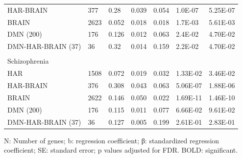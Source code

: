 \begin{refsection}
\begin{table}[H]
\begin{tabular}{@{}lllllll@{}}
HAR-BRAIN                         & 377  & 0.28   & 0.039  & 0.054 & 1.0E-07  & 5.25E-07   \\
BRAIN                             & 2623 & 0.052  & 0.018  & 0.018 & 1.7E-03  & 5.61E-03   \\
DMN (200)                         & 176  & 0.126  & 0.012  & 0.063 & 2.4E-02  & 4.70E-02   \\
DMN-HAR-BRAIN (37)                & 36   & 0.32   & 0.014  & 0.159 & 2.2E-02  & 4.70E-02   \\
                                  &      &        &        &       &          &            \\
Schizophrenia                     &      &        &        &       &          &            \\
HAR                               & 1508 & 0.072  & 0.019  & 0.032 & 1.33E-02 & 3.46E-02   \\
HAR-BRAIN                         & 376  & 0.308  & 0.043  & 0.063 & 5.06E-07 & 1.88E-06   \\
BRAIN                             & 2622 & 0.146  & 0.050  & 0.022 & 1.69E-11 & 1.46E-10   \\
DMN (200)                         & 176  & 0.115  & 0.011  & 0.077 & 6.66E-02 & 9.61E-02   \\
DMN-HAR-BRAIN (37)                & 36   & 0.127  & 0.005  & 0.199 & 2.61E-01 & 2.83E-01   \\ \hline
\end{tabular}
{\begin{flushleft}
\scriptsize N: Number of genes; b: regression coefficient; β: standardized regression coefficient; SE: standard error; p values adjusted for FDR. BOLD: significant.
\end{flushleft}}
\end{table}



\end{refsection}
